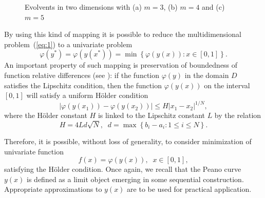 \documentclass[smallcondensed]{svjour3}     %
\begin{document}
\begin{figure}[ht]
\begin{minipage}{0.32\linewidth}
\end{minipage}
\begin{minipage}{0.32\linewidth}
\end{minipage}
\caption{Evolvents in two dimensions with (a) $m=3$, (b) $m=4$ and (c) $m=5$}
\label{fig:0}
\end{figure}



By using this kind of mapping it is possible to reduce the multidimensional problem~(\ref{eq:1}) to a univariate problem
\[
\varphi(y^\ast)=\varphi(y(x^\ast))=\min{\left\{\varphi(y(x)): x\in[0,1]\right\}}.
\]
An important property of such mapping is preservation of boundedness of function relative differences  (see \cite{RefStrongin2000}): if the function $\varphi(y)$ in the domain $D$ satisfies the Lipschitz condition, then the function $\varphi(y(x))$ on the interval $[0,1]$ will satisfy a uniform H{\"o}lder condition
\[
\left|\varphi(y(x_1))-\varphi(y(x_2))\right|\leq H\left|x_1-x_2\right|^{1/N},
\]
where the H{\"o}lder constant $H$ is linked to the Lipschitz constant $L$ by the relation
\[
H=4Ld\sqrt{N},\;\; d=\max{\left\{b_i-a_i:1\leq i \leq N\right\}}.
\]

Therefore, it is possible, without loss of generality, to consider minimization of univariate function
\[
f(x)=\varphi(y(x)), \;\; x\in[0,1],
\]
satisfying the H{\"o}lder condition.
Once again, we recall that the Peano curve $y(x)$ is defined as a limit object emerging in some sequential construction. Appropriate approximations to $y(x)$ are to be used for practical application.
\end{document}
